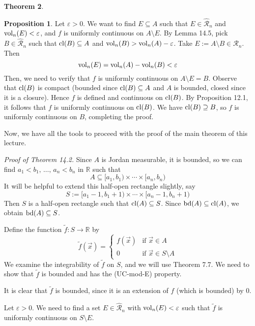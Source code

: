 \documentclass[11pt]{article}
\makeatletter
\theoremstyle{definition}
\newtheorem{thm}{Theorem}[section]
\newtheorem{prop}[thm]{Proposition}
\newcommand{\R}{\ensuremath{\mathbb{R}}}
\newenvironment{pf}[1][\proofname]{\par
  \pushQED{\qed}%
  \normalfont \topsep0\p@\relax
  \trivlist
  \item[\hskip\labelsep\itshape
  #1\@addpunct{.}]\ignorespaces
}{%
  \popQED\endtrivlist\@endpefalse
}
\makeatother
\begin{document}
\begin{thm}
\begin{prop}
\begin{pf}
Let $\varepsilon > 0$. We want to find $E \subseteq A$ such that $E \in \widehat{\mathcal{R}}_n$ and ${\rm vol}_n(E) < \varepsilon$, and $f$ is uniformly continuous on $A \setminus E$. By Lemma 14.5, pick $B \in \widehat{\mathcal{R}}_n$ such that ${\rm cl}(B) \subseteq A$ and ${\rm vol}_n(B) > {\rm vol}_n(A) - \varepsilon$. Take $E := A \setminus B \in \widehat{\mathcal{R}}_n$. Then
$${\rm vol}_n(E) = {\rm vol}_n(A) - {\rm vol}_n(B) < \varepsilon$$
Then, we need to verify that $f$ is uniformly continuous on $A \setminus E = B$. Observe that ${\rm cl}(B)$ is compact (bounded since ${\rm cl}(B) \subseteq A$ and $A$ is bounded, closed since it is a closure). Hence $f$ is defined and continuous on ${\rm cl}(B)$. By Proposition 12.1, it follows that $f$ is uniformly continuous on ${\rm cl}(B)$. We have ${\rm cl}(B) \supseteq B$, so $f$ is uniformly continuous on $B$, completing the proof.
\end{pf}
\end{prop}

Now, we have all the tools to proceed with the proof of the main theorem of this lecture.

\emph{Proof of Theorem 14.2.}
Since $A$ is Jordan measurable, it is bounded, so we can find $a_1 < b_1,\, \dots,\, a_n < b_n$ in $\R$ such that
$$A \subseteq [a_1, b_1) \times \cdots \times [a_n, b_n)$$
It will be helpful to extend this half-open rectangle slightly, say
$$S := [a_1 - 1, b_1 + 1) \times \cdots \times [a_n - 1, b_n + 1)$$
Then $S$ is a half-open rectangle such that ${\rm cl}(A) \subseteq S$. Since ${\rm bd}(A) \subseteq {\rm cl}(A)$, we obtain ${\rm bd}(A) \subseteq S$. 

Define the function $\tilde{f} : S \to \R$ by
$$\tilde{f}(\vec{x}) = \begin{cases} f(\vec{x}) & \text{if } \vec{x} \in A \\ 0 & \text{if } \vec{x} \in S \setminus A \end{cases}$$
We examine the integrability of $\tilde{f}$ on $S$, and we will use Theorem 7.7. We need to show that $\tilde{f}$ is bounded and has the (UC-mod-E) property. 

It is clear that $\tilde{f}$ is bounded, since it is an extension of $f$ (which is bounded) by 0. 

Let $\varepsilon > 0$. We need to find a set $E \in \widehat{\mathcal{R}}_n$ with ${\rm vol}_n(E) < \varepsilon$ such that $\tilde{f}$ is uniformly continuous on $S \setminus E$. 


\end{thm}
\end{document}
